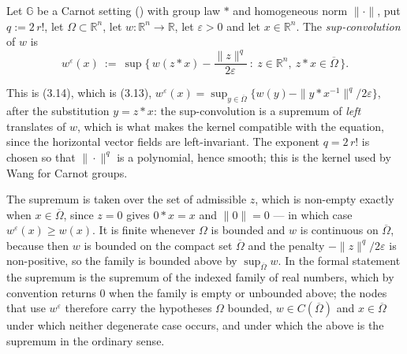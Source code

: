 \begin{definition}
Let $\mathbb G$ be a Carnot setting () with group law $*$ and
homogeneous norm $\|\cdot\|$, put $q:=2\,r!$, let $\Omega\subset\mathbb R^n$, let
$w:\mathbb R^n\to\mathbb R$, let $\varepsilon>0$ and let $x\in\mathbb R^n$. The
\emph{sup-convolution} of $w$ is
\[
 w^{\varepsilon}(x)\ :=\ \sup\Big\{\,w(z*x)-\frac{\|z\|^{q}}{2\varepsilon}\ :\
   z\in\mathbb R^n,\ z*x\in\overline\Omega\,\Big\} .
\]

This is (3.14), which is (3.13),
$w^{\varepsilon}(x)=\sup_{y\in\overline\Omega}\{w(y)-\|y*x^{-1}\|^{q}/2\varepsilon\}$,
after the substitution $y=z*x$: the sup-convolution is a supremum of \emph{left}
translates of $w$, which is what makes the kernel compatible with the equation, since the
horizontal vector fields are left-invariant. The exponent $q=2\,r!$ is chosen so that
$\|\cdot\|^{q}$ is a polynomial, hence smooth; this is the kernel used by Wang for Carnot
groups.

The supremum is taken over the set of admissible $z$, which is non-empty exactly when
$x\in\overline\Omega$, since $z=0$ gives $0*x=x$ and $\|0\|=0$ --- in which case
$w^{\varepsilon}(x)\ge w(x)$. It is finite whenever $\Omega$ is bounded and $w$ is
continuous on $\overline\Omega$, because then $w$ is bounded on the compact set
$\overline\Omega$ and the penalty $-\|z\|^{q}/2\varepsilon$ is non-positive, so the family
is bounded above by $\sup_{\overline\Omega}w$. In the formal statement the supremum is the
supremum of the indexed family of real numbers, which by convention returns $0$ when the
family is empty or unbounded above; the nodes that use $w^{\varepsilon}$ therefore carry
the hypotheses $\Omega$ bounded, $w\in C(\overline\Omega)$ and $x\in\overline\Omega$ under
which neither degenerate case occurs, and under which the above is the supremum in the
ordinary sense.
\end{definition}
